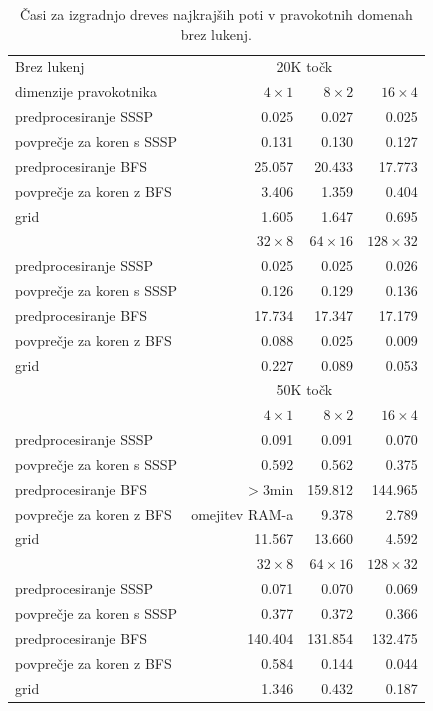 \documentclass[a4paper, 12pt]{book}
\begin{document}
\begin{table}
\begin{center}
\begin{tabular}{l*{3}{r}}
Brez lukenj & \multicolumn{3}{c}{20K točk}\\						
dimenzije pravokotnika	&	$4\times 1$	&	$8\times 2$	&	$16\times 4$ \\
\hline
predprocesiranje SSSP	&	0.025	&	0.027	&	0.025		\\
povprečje za koren s SSSP	&	0.131	&	0.130	&	0.127		\\
predprocesiranje BFS 	&	25.057	&	20.433	&	17.773		\\
povprečje za koren z BFS	&	3.406	&	1.359	&	0.404		\\
grid	&	1.605	&	1.647	&	0.695	\vspace{.2cm}	\\

&	$32\times 8$	&	$64\times 16$	&	$128\times 32$	\\
\hline
predprocesiranje SSSP &	0.025	&	0.025	&	0.026 \\
povprečje za koren s SSSP &	0.126	&	0.129	&	0.136 \\
predprocesiranje BFS &	17.734	&	17.347	&	17.179 \\
povprečje za koren z BFS &	0.088	&	0.025	&	0.009 \\
grid &	0.227	&	0.089	&	0.053 \vspace{.2cm} \\
\hline
  & \multicolumn{3}{c}{50K točk}  \\						
&	$4\times 1$	&	$8\times 2$	&	$16\times 4$ \\
\hline
predprocesiranje SSSP	&	0.091	&	0.091	&	0.070		\\
povprečje za koren s SSSP	&	0.592	&	0.562	&	0.375		\\
predprocesiranje BFS	&	$>$3min	&	159.812	&	144.965		\\
povprečje za koren z BFS	& omejitev RAM-a & 9.378	&	2.789		\\
grid				&	11.567	&	13.660	&	4.592	\\

&	$32\times 8$	&	$64\times 16$	&	$128\times 32$	\\
\hline
predprocesiranje SSSP &	0.071	&	0.070	&	0.069 \\
povprečje za koren s SSSP &	0.377	&	0.372	&	0.366 \\
predprocesiranje BFS &	140.404	&	131.854	&	132.475 \\
povprečje za koren z BFS &	0.584	&	0.144	&	0.044 \\
grid &	1.346	&	0.432	&	0.187
\end{tabular}
\caption{Časi za izgradnjo dreves najkrajših poti v pravokotnih domenah brez lukenj.}
\label{table1}
\end{center}
\end{table}
\end{document}
